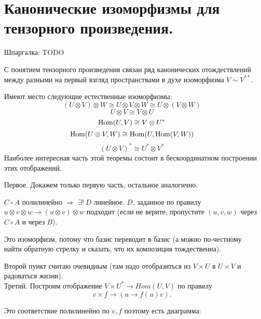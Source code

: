 \section{
 Канонические изоморфизмы для тензорного произведения.
}

Шпаргалка: TODO

С понятием тензорного произведения связан ряд канонических отождествлений между разными на первый взгляд пространствами в духе изоморфизма $V \sim V^{**}$.

\thrm 
	Имеют место следующие естественные изоморфизмы: 
	$$(U \otimes V) \otimes W \cong U \otimes V \otimes W \cong U \otimes (V \otimes W)$$
	$$ U \otimes V \cong V \otimes U $$
	$$ \operatorname{Hom} (U,V) \cong V \otimes U^*$$
	$$ \operatorname{Hom} (U\otimes V,  W) \cong \operatorname{Hom} (U, \operatorname{Hom} (V,W))$$
	$$(U \otimes V)^{*} \cong U^{*}\otimes V^{*}$$
	\proof 
		Наиболее интересная часть этой теоремы состоит в бескоординатном построении этих отображений. 

		Первое. Докажем только первую часть, остальное аналогично.

\begin{center}
\end{center}

		$C\circ A$ полилинейно $\Rightarrow$ $\exists!\ D$ линейное. $D$, заданное по правилу $u\otimes v\otimes w\to (u\otimes v)\otimes w$ подходит (если не верите, пропустите $(u, v, w)$ через $C\circ A$ и через $B$).

		Это изоморфизм, потому что базис переводит в базис (а можно по-честному найти обратную стрелку и сказать, что их композиция тождественна).

		Второй пункт считаю очевидным (там надо отобразиться из $V\times U$ в $U\times V$ и радоваться жизни).\\

		Третий. Построим отображение $V\times U^{*} \to Hom (U,V)$ по правилу $$v\times f \to (u \to f(u)v).$$

		Это соответствие полилинейно по $v,f$ поэтому есть диаграмма:

